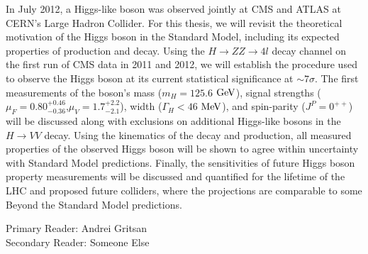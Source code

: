 In July 2012, a Higgs-like boson was observed jointly at CMS and ATLAS at CERN's Large Hadron Collider. For this thesis, we will revisit the theoretical motivation of the Higgs boson in the Standard Model, including its expected properties of production and decay. Using the $H\rightarrow ZZ\rightarrow 4l$ decay channel on the first run of CMS data in 2011 and 2012, we will establish the procedure used to observe the Higgs boson at its current statistical significance at $\sim7\sigma$. The first measurements of the boson's mass ($m_{H}=125.6$ $\rm{GeV}$), signal strengths ($\mu_F = 0.80^{+0.46}_{-0.36}$,$\mu_V=1.7^{+2.2}_{-2.1}$), width ($\Gamma_{H}<46$ $\rm{MeV}$), and spin-parity ($J^{P} = 0^{++}$) will be discussed along with exclusions on additional Higgs-like bosons in the $H\rightarrow VV$ decay. Using the kinematics of the decay and production, all measured properties of the observed Higgs boson will be shown to agree within uncertainty with Standard Model predictions. Finally, the sensitivities of future Higgs boson property measurements will be discussed and quantified for the lifetime of the LHC and proposed future colliders, where the projections are comparable to some Beyond the Standard Model predictions. 

\vspace{1cm}

\noindent Primary Reader: Andrei Gritsan\\
Secondary Reader: Someone Else